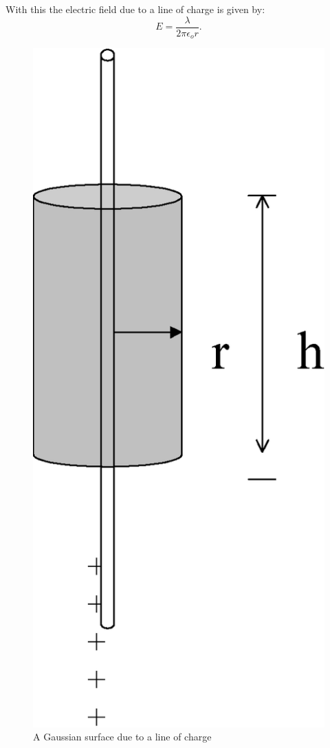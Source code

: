 {\noindent With this the electric field due to a line of charge is
given by:
\begin{equation}
E= \frac{\lambda}{2\pi\epsilon_o r}.\label{line}
\end{equation}

\begin{figure}[!htb]
\centering
\epsfxsize=6cm \includegraphics[scale=0.4]{1_electrostatics/es3.eps}
\caption{A Gaussian surface due to a line of charge}
 \label{es3}
\end{figure}



}
